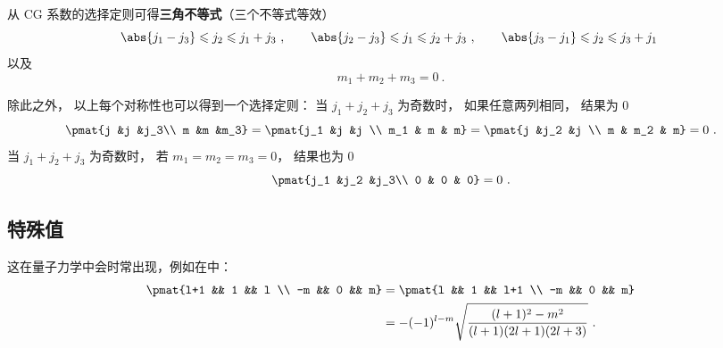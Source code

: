 从 CG 系数的选择定则可得\textbf{三角不等式}（三个不等式等效）
\begin{equation}
\abs{j_1 - j_3} \leqslant j_2 \leqslant j_1 + j_3~,\qquad
\abs{j_2 - j_3} \leqslant j_1 \leqslant j_2 + j_3 ~,\qquad
\abs{j_3 - j_1} \leqslant j_2 \leqslant j_3 + j_1~
\end{equation}
以及
\begin{equation}\label{eq_ThreeJ_1}
m_1 + m_2 + m_3 = 0~.
\end{equation}

除此之外， 以上每个对称性也可以得到一个选择定则： 当 $j_1 + j_2 + j_3$ 为奇数时， 如果任意两列相同， 结果为 $0$
\begin{equation}\label{eq_ThreeJ_7}
\pmat{j &j &j_3\\ m &m &m_3} = \pmat{j_1 &j &j \\ m_1 & m & m} =  \pmat{j &j_2 &j \\ m & m_2 & m} = 0~.
\end{equation}
当 $j_1 + j_2 + j_3$ 为奇数时， 若 $m_1 = m_2 = m_3 = 0$， 结果也为 $0$
\begin{equation}\label{eq_ThreeJ_8}
\pmat{j_1 &j_2 &j_3\\ 0 & 0 & 0} = 0~.
\end{equation}

\subsection{特殊值}
这在量子力学中会时常出现，例如在中：
\begin{equation}\label{eq_ThreeJ_3}
\begin{aligned} %
\pmat{l+1 && 1 && l \\ -m && 0 && m} &= \pmat{l && 1 && l+1 \\ -m && 0 && m}\\
&= -(-1)^{l-m} \sqrt{\frac{(l+1)^2-m^2}{(l+1)(2l+1)(2l+3)}}~.
\end{aligned}
\end{equation}
